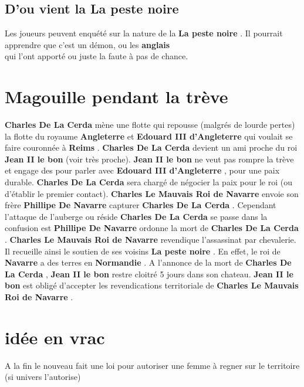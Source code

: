 \documentclass[oneside,12pt]{book}
\newcommand{\Navarre}{\textbf{Navarre} }
\newcommand{\Angleterre}{\textbf{Angleterre} }
\newcommand{\Normandie}{\textbf{Normandie} }
\newcommand{\Reims}{\textbf{Reims} }
\newcommand{\Jeanne}{\textbf{Jeanne Reine de Navarre} }%
\newcommand{\JeanII}{\textbf{Jean II le bon} }
\newcommand{\EdouardIII}{\textbf{Edouard III d'Angleterre} }%
\newcommand{\CharlesLeMauvais}{\textbf{Charles Le Mauvais Roi de Navarre} }%
\newcommand{\PhillipeDeNavarre}{\textbf{Phillipe De Navarre} }%
\newcommand{\DeLaCerda}{\textbf{Charles De La Cerda} }
\newcommand{\Peste}{\textbf{La peste noire} }
\newcommand{\Normand}{\textbf{La peste noire} }
\newcommand{\Anglais}{\textbf{anglais\\} }
\begin{document}
\begin{flushleft}
\subsection{D'ou vient la \Peste}
Les joueurs peuvent enquété sur la nature de la \Peste. Il pourrait apprendre que c'est un démon, ou les \Anglais qui l'ont 
apporté ou juste la faute à pas de chance. 

\section{Magouille pendant la trève}
\DeLaCerda mène une flotte qui repousse (malgrés de lourde pertes) la flotte du royaume \Angleterre et  \EdouardIII qui voulait se faire 
couronnée à \Reims.
\DeLaCerda devient un ami proche du roi \JeanII (voir très proche). 
\JeanII ne veut pas rompre la trève et engage des pour parler avec \EdouardIII, pour une paix durable. \DeLaCerda sera chargé de 
négocier la paix pour le roi (ou d'établir le premier contact).  
\CharlesLeMauvais envoie son frère \PhillipeDeNavarre capturer \DeLaCerda. Cependant l'attaque de l'auberge ou réside \DeLaCerda 
se passe dans la confusion est  \PhillipeDeNavarre ordonne la mort de \DeLaCerda. \CharlesLeMauvais revendique l'assassinat par 
chevalerie. Il recueille ainsi le soutien de ses voisins \Normand. En effet, le roi de \Navarre a des terres en \Normandie.
A l'annonce de la mort de \DeLaCerda, \JeanII restre cloitré 5 jours dans son chateau. 
\JeanII est obligé d'accepter les revendications territoriale de \CharlesLeMauvais.
 










 

\section{idée en vrac}
A la fin le nouveau fait une loi pour autoriser une femme à regner sur le territoire (si univers l'autorise)







\end{flushleft}
\end{document}
